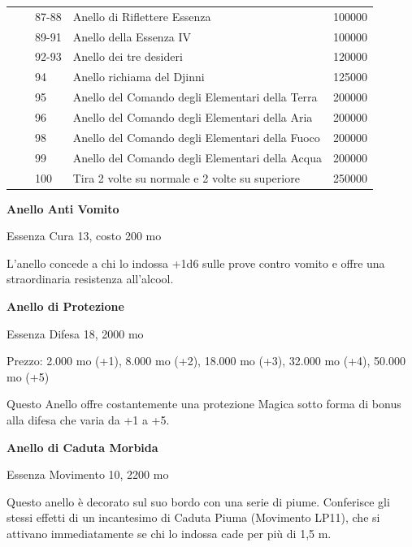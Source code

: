 \documentclass[a4paper,11pt,twoside,openany]{book}
\begin{document}
\begin{tabular}{lllll}
	 &    & 87-88             & Anello di Riflettere Essenza\index{Anello di Riflettere Essenza}        & 100000\\
	 &    & 89-91             & Anello della Essenza IV & 100000\\
	 &    & 92-93             & Anello dei tre desideri \index{Anello dei tre desideri} & 120000\\
	 &    & 94& Anello richiama del Djinni \index{Anello richiama del Djinni}           & 125000\\
	 &    & 95& Anello del Comando degli Elementari della Terra \index{Anello del Comando degli Elementari della Terra} & 200000\\
	 &    & 96& Anello del Comando degli Elementari della Aria\index{Anello del Comando degli Elementari della Aria}    & 200000\\
	 &    & 98& Anello del Comando degli Elementari della Fuoco \index{Anello del Comando degli Elementari della Fuoco} & 200000\\
	 &    & 99& Anello del Comando degli Elementari della Acqua \index{Anello del Comando degli Elementari della Acqua} & 200000\\
	 &    & 100               & Tira 2 volte su normale e 2 volte su superiore          & 250000\\
\end{tabular}

\pagebreak

\textbf{Anello Anti Vomito}

Essenza Cura 13, costo 200 mo

L'anello concede a chi lo indossa +1d6 sulle prove contro vomito e offre una straordinaria resistenza all'alcool.

\textbf{Anello di Protezione}

Essenza Difesa 18, 2000 mo

Prezzo: 2.000 mo (+1), 8.000 mo (+2), 18.000 mo (+3), 32.000 mo (+4),
50.000 mo (+5)

Questo Anello offre costantemente una protezione Magica sotto forma di bonus alla difesa che varia da +1 a +5.

\textbf{Anello di Caduta Morbida}

Essenza Movimento 10, 2200 mo

Questo anello è decorato sul suo bordo con una serie di piume. Conferisce gli stessi effetti di un incantesimo di Caduta Piuma (Movimento LP11), che si attivano immediatamente se chi lo indossa cade per più di 1,5 m.
\end{document}
